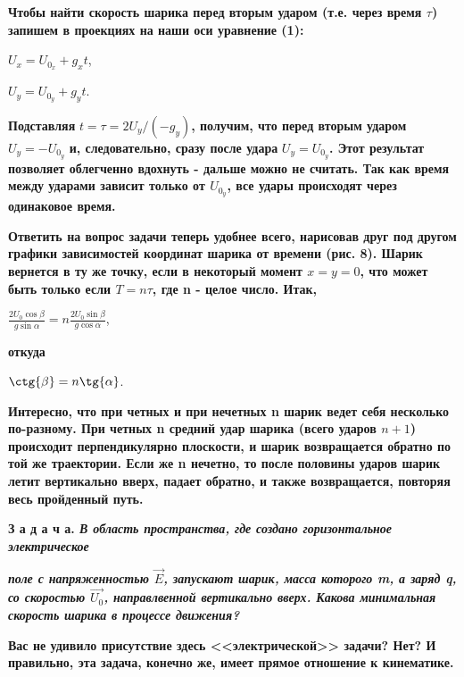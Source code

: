 \documentclass[a4paper,14pt]{article}
\begin{document}
    \begin{multicols}{2}
        
        \noindent\textbf{Чтобы найти скорость шарика перед вторым ударом (т.е. через время $\tau$) запишем в проекциях на наши оси уравнение (1):}
        
        \noindent $U_x = U_{0_x} + g_xt$,
        
        \noindent $U_y = U_{0_y} + g_yt$. 
        
        \noindent\textbf{Подставляя} $t=\tau=2U_y/(-g_y)$\textbf{, получим, что перед вторым ударом} $U_y=-U_{0_y}$ \textbf{и, следовательно, сразу после удара} $U_y=U_{0_y}$\textbf{. Этот результат позволяет облегченно вдохнуть - дальше можно не считать. Так как время между ударами зависит только от $U_{0_y}$, все удары происходят через одинаковое время.}
        
        \textbf{Ответить на вопрос задачи теперь удобнее всего, нарисовав друг под другом графики зависимостей координат шарика от времени (рис. 8). Шарик вернется в ту же точку, если в некоторый момент $x=y=0$, что  может быть только если $T=n\tau$, где n - целое число. Итак,}
        
        $\frac{2U_0\cos\beta}{g\sin{\alpha}} = n\frac{2U_0\sin\beta}{g\cos{\alpha}}$, 
        
        \noindent\textbf{откуда}
        
        $\ctg{\beta} = n \tg{\alpha}$.
        
        \textbf{Интересно, что при четных и при нечетных n шарик ведет себя несколько по-разному. При четных n средний удар шарика (всего ударов $n + 1$) происходит перпендикулярно плоскости, и шарик возвращается обратно по той же траектории. Если же n нечетно, то после половины ударов шарик летит вертикально вверх, падает обратно, и также возвращается, повторяя весь пройденный путь.}
        
        \textbf{З а д а ч а. \textit{В область пространства, где создано горизонтальное электрическое}}
        
        \columnbreak
        
        \noindent\textbf{\textit{поле с напряженностью $\vec{E}$, запускают шарик, масса которого m, а заряд q, со скоростью $\vec{U_0}$, направлвенной вертикально вверх. Какова минимальная скорость шарика в процессе движения?}}
        
        \textbf{Вас не удивило присутствие здесь <<электрической>> задачи? Нет? И правильно, эта задача, конечно же, имеет прямое отношение к кинематике.}
        

\end{multicols}
\end{document}

